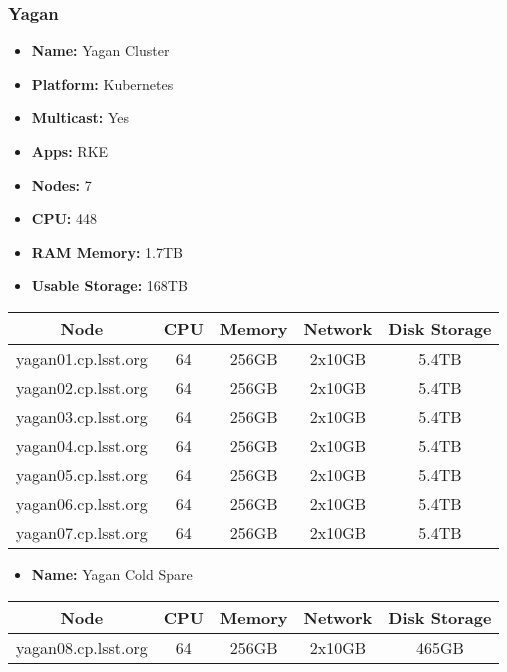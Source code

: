 \subsubsection{Yagan}
\begin{itemize}
  \itemsep0em 
  \item \textbf{Name:}       Yagan Cluster
  \item \textbf{Platform:}   Kubernetes
  \item \textbf{Multicast:}  Yes
  \item \textbf{Apps:}       RKE
  \item \textbf{Nodes:}      7
  \item \textbf{CPU:}        448
  \item \textbf{RAM Memory:} 1.7TB
  \item \textbf{Usable Storage:}   168TB
\end{itemize}
\begin{center}
  \small
  \begin{tabular}{||c c c c c||} 
    \hline
    \textbf{Node} & \textbf{CPU} & \textbf{Memory} & \textbf{Network} & \textbf{Disk Storage} \\ [0.5ex]
    \hline
    yagan01.cp.lsst.org & 64 & 256GB & 2x10GB & 5.4TB \\
    \hline
    yagan02.cp.lsst.org & 64 & 256GB & 2x10GB & 5.4TB \\
    \hline
    yagan03.cp.lsst.org & 64 & 256GB & 2x10GB & 5.4TB \\
    \hline
    yagan04.cp.lsst.org & 64 & 256GB & 2x10GB & 5.4TB \\
    \hline
    yagan05.cp.lsst.org & 64 & 256GB & 2x10GB & 5.4TB \\
    \hline
    yagan06.cp.lsst.org & 64 & 256GB & 2x10GB & 5.4TB \\
    \hline
    yagan07.cp.lsst.org & 64 & 256GB & 2x10GB & 5.4TB \\
    \hline
  \end{tabular}
\end{center}

\begin{itemize}
  \itemsep0em 
  \item \textbf{Name:}       Yagan Cold Spare
\end{itemize}
\begin{center}
  \small
  \begin{tabular}{||c c c c c||} 
    \hline
    \textbf{Node} & \textbf{CPU} & \textbf{Memory} & \textbf{Network} & \textbf{Disk Storage} \\ [0.5ex]
    \hline
    yagan08.cp.lsst.org & 64 & 256GB & 2x10GB & 465GB \\
    \hline
  \end{tabular}
\end{center}

